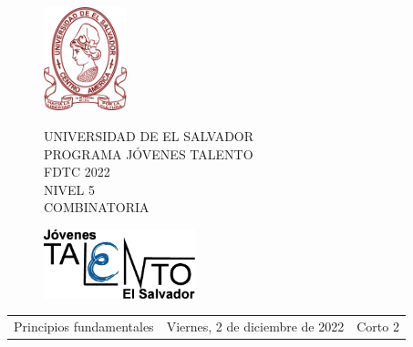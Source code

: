 \documentclass[12pt]{article}
\newcommand{\tema}{Principios fundamentales}
\newcommand{\fecha}{Viernes, 2 de diciembre de 2022}
\newcommand{\sesion}{Corto 2}
\begin{document}
\thispagestyle{empty}

\begin{figure}[h] 
	\begin{minipage}[b]{0.26\textwidth}
		\begin{center}
			\includegraphics[height=3cm]{Logos/UES.png}
			\par\end{center}
	\end{minipage} 
	\begin{minipage}[b]{0.46\textwidth}
		\begin{center}
			UNIVERSIDAD DE EL SALVADOR\\ [0.1cm]
			PROGRAMA JÓVENES TALENTO\\ [0.1cm]
	        FDTC 2022\\ [0.1cm]
                NIVEL 5\\ [0.1cm]
			COMBINATORIA 
			\par\end{center}
	\end{minipage} 
	\begin{minipage}[b]{0.05\textwidth}
		\begin{center}
			\includegraphics[height=2cm]{Logos/LOGO PJT.png}
			\par\end{center}
	\end{minipage}
\end{figure}

\begin{center}
    \begin{tabular}{p{4.5cm} p{7cm} p{4.5cm}}
        \tema & \centering\fecha & \hfill\sesion
    \end{tabular}
\end{center}
\end{document}
